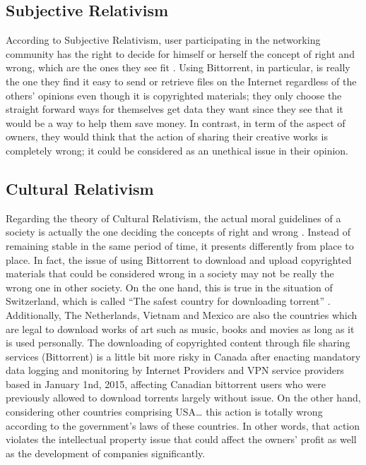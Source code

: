 \documentclass[conference]{IEEEtran}
\begin{document}
\subsection{Subjective Relativism}
According to Subjective Relativism, user participating in the networking community has the right to decide for himself or herself the concept of right and wrong, which are the ones they see fit \cite{quinn2014ethics} . Using Bittorrent, in particular, is really the one they find it easy to send or retrieve files on the Internet regardless of the others’ opinions even though it is copyrighted materials; they only choose the straight forward ways for themselves get data they want since they see that it would be a way to help them save money. In contrast, in term of the aspect of owners, they would think that the action of sharing their creative works is completely wrong; it could be considered as an unethical issue in their opinion.

\subsection{Cultural Relativism}
Regarding the theory of Cultural Relativism, the actual moral guidelines of a society is actually the one deciding the concepts of right and wrong \cite{quinn2014ethics}. Instead of remaining stable in the same period of time, it presents differently from place to place. In fact, the issue of using Bittorrent to download and upload copyrighted materials that could be considered wrong in a society may not be really the wrong one in other society. On the one hand, this is true in the situation of Switzerland, which is called “The safest country for downloading torrent” \cite{safesttorrent}. Additionally, The Netherlands, Vietnam and Mexico are also the countries which are legal to download works of art such as music, books and movies as long as it is used personally. The downloading of copyrighted content through file sharing services (Bittorrent) is a little bit more risky in Canada after enacting mandatory data logging and monitoring by Internet Providers and VPN service providers based in January 1nd, 2015, affecting Canadian bittorrent users who were previously allowed to download torrents largely without issue\cite{safesttorrent}.  On the other hand, considering other countries comprising USA… this action is totally wrong according to the government’s laws of these countries. In other words, that action violates the intellectual property issue that could affect the owners’ profit as well as the development of companies significantly.
\end{document}

